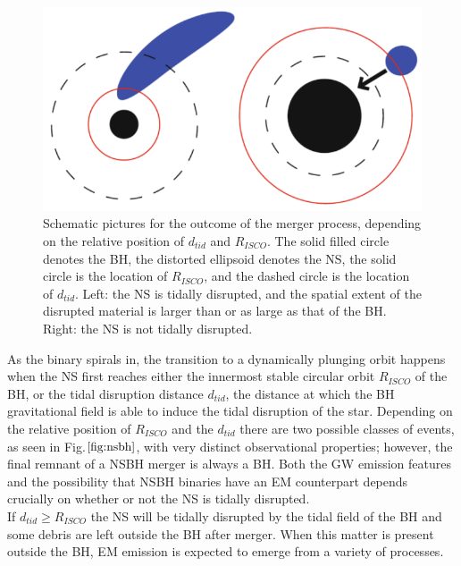 \documentclass[binding=0.6cm, LaM]{sapthesis}
\begin{document}
                 \begin{figure}[H]
                        \label{nsbh}
                        \includegraphics[scale=0.45]{nsbh}
                        \centering
                        \caption{Schematic pictures for the outcome of the merger process, depending on the relative position of $d_{tid}$ and $R_{ISCO}$. The solid filled circle denotes the BH, the distorted ellipsoid denotes the NS, the solid circle is the location of $R_{ISCO}$, and the dashed circle is the location of  $d_{tid}$. Left: the NS is tidally disrupted, and the spatial extent of the disrupted material is larger than or as large as that of the BH. Right: the NS is not tidally disrupted.}
                         \label{fig:nsbh}
                \end{figure}
        As the binary spirals in, the transition to a dynamically plunging orbit happens
        when the NS first reaches either the innermost stable circular orbit $R_{ISCO}$ of the BH, or the tidal disruption distance $d_{tid}$,
        the distance at which the BH gravitational field is able to induce the tidal disruption of the star.
        Depending on the relative position of $R_{ISCO}$ and the $d_{tid}$ there are
        two possible classes of events, as seen in Fig.$\ref{fig:nsbh}$, with very distinct observational properties;
        however, the final remnant of a NSBH merger is always a BH.
        Both the GW emission features and the possibility that NSBH binaries have an EM counterpart
        depends crucially on whether or not the NS is tidally disrupted. \\
        If $d_{tid} \geq R_{ISCO}$ the NS will be tidally disrupted by the tidal field of the BH
        and some debris are left outside the BH after merger.
        When this matter is present outside the BH, EM emission is expected to emerge from a variety of processes.
\end{document}
